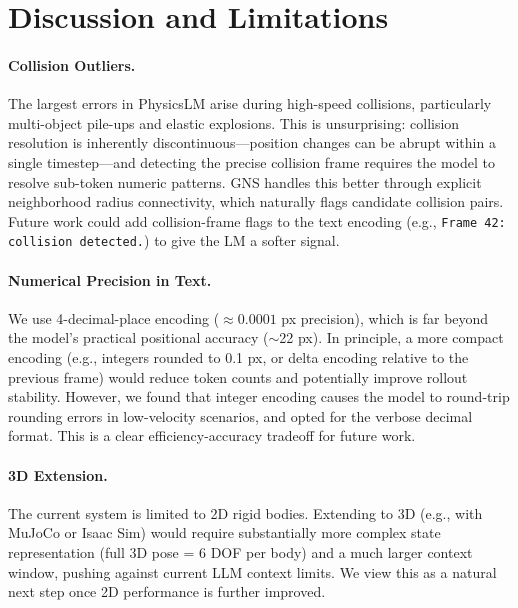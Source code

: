 \documentclass{article}
\begin{document}
\section{Discussion and Limitations}
\label{sec:discussion}

\paragraph{Collision Outliers.}
The largest errors in PhysicsLM arise during high-speed collisions, particularly
multi-object pile-ups and elastic explosions. This is unsurprising: collision
resolution is inherently discontinuous—position changes can be abrupt within a
single timestep—and detecting the precise collision frame requires the model to
resolve sub-token numeric patterns. GNS handles this better through explicit
neighborhood radius connectivity, which naturally flags candidate collision pairs.
Future work could add collision-frame flags to the text encoding (e.g.,
\texttt{Frame 42: collision detected.}) to give the LM a softer signal.

\paragraph{Numerical Precision in Text.}
We use 4-decimal-place encoding ($\approx 0.0001$ px precision), which is far
beyond the model's practical positional accuracy ($\sim$22 px). In principle,
a more compact encoding (e.g., integers rounded to 0.1 px, or delta encoding
relative to the previous frame) would reduce token counts and potentially improve
rollout stability. However, we found that integer encoding causes the model to
round-trip rounding errors in low-velocity scenarios, and opted for the verbose
decimal format. This is a clear efficiency-accuracy tradeoff for future work.

\paragraph{3D Extension.}
The current system is limited to 2D rigid bodies. Extending to 3D (e.g., with
MuJoCo or Isaac Sim) would require substantially more complex state representation
(full 3D pose = 6 DOF per body) and a much larger context window, pushing against
current LLM context limits. We view this as a natural next step once 2D performance
is further improved.
\end{document}
